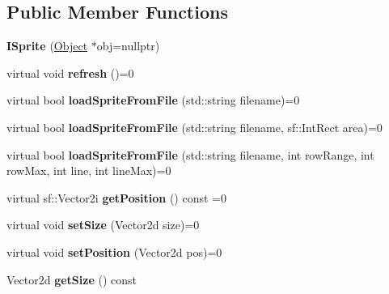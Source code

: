 \subsection*{Public Member Functions}
\begin{DoxyCompactItemize}
\item 
{\bfseries I\+Sprite} (\hyperlink{class_otter_engine_1_1_object}{Object} $\ast$obj=nullptr)\hypertarget{class_otter_engine_1_1_i_sprite_a319ada79f4c75bd754ed5cadac922dd6}{}\label{class_otter_engine_1_1_i_sprite_a319ada79f4c75bd754ed5cadac922dd6}

\item 
virtual void {\bfseries refresh} ()=0\hypertarget{class_otter_engine_1_1_i_sprite_a005f57081b0a34a0cb6beabc55088ff5}{}\label{class_otter_engine_1_1_i_sprite_a005f57081b0a34a0cb6beabc55088ff5}

\item 
virtual bool {\bfseries load\+Sprite\+From\+File} (std\+::string filename)=0\hypertarget{class_otter_engine_1_1_i_sprite_a44458d8191700f31f3559d8921580f39}{}\label{class_otter_engine_1_1_i_sprite_a44458d8191700f31f3559d8921580f39}

\item 
virtual bool {\bfseries load\+Sprite\+From\+File} (std\+::string filename, sf\+::\+Int\+Rect area)=0\hypertarget{class_otter_engine_1_1_i_sprite_a3f7f566e43b117c4c541d29ce7ba83cb}{}\label{class_otter_engine_1_1_i_sprite_a3f7f566e43b117c4c541d29ce7ba83cb}

\item 
virtual bool {\bfseries load\+Sprite\+From\+File} (std\+::string filename, int row\+Range, int row\+Max, int line, int line\+Max)=0\hypertarget{class_otter_engine_1_1_i_sprite_a67703349467fa6eb4bddc99f8011056a}{}\label{class_otter_engine_1_1_i_sprite_a67703349467fa6eb4bddc99f8011056a}

\item 
virtual sf\+::\+Vector2i {\bfseries get\+Position} () const =0\hypertarget{class_otter_engine_1_1_i_sprite_ac607cbe709bd66e3186290f37d4d160b}{}\label{class_otter_engine_1_1_i_sprite_ac607cbe709bd66e3186290f37d4d160b}

\item 
virtual void {\bfseries set\+Size} (Vector2d size)=0\hypertarget{class_otter_engine_1_1_i_sprite_a6d3560263c49ae900d589ce85b884024}{}\label{class_otter_engine_1_1_i_sprite_a6d3560263c49ae900d589ce85b884024}

\item 
virtual void {\bfseries set\+Position} (Vector2d pos)=0\hypertarget{class_otter_engine_1_1_i_sprite_a4ffdf02f20caacb47a5907ae5c61b7be}{}\label{class_otter_engine_1_1_i_sprite_a4ffdf02f20caacb47a5907ae5c61b7be}

\item 
Vector2d {\bfseries get\+Size} () const \hypertarget{class_otter_engine_1_1_i_sprite_a82291027e93ea18aea4dbc02ea08ae74}{}\label{class_otter_engine_1_1_i_sprite_a82291027e93ea18aea4dbc02ea08ae74}

\end{DoxyCompactItemize}
